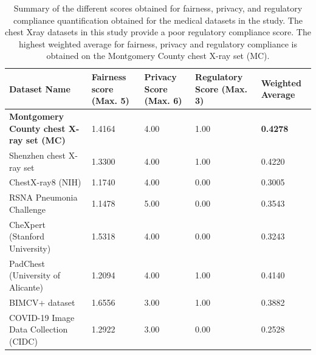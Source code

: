 \documentclass[journal]{IEEEtran}
\begin{document}
\begin{table}[]
\caption{\label{tab:fprsummarymedical}Summary of the different scores obtained for fairness, privacy, and regulatory compliance quantification obtained for the medical datasets in the study. The chest Xray datasets in this study provide a poor regulatory compliance score. The highest weighted average for fairness, privacy and regulatory compliance is obtained on the Montgomery County chest X-ray set (MC).}
\centering
\begin{tabular}{|p{}|C{0.13\textwidth}|C{0.13\textwidth}|C{0.13\textwidth}|C{0.13\textwidth}|}
\hline
\textbf{Dataset Name}                                                   & \textbf{Fairness score (Max. 5)} & \textbf{Privacy Score (Max. 6)} & \textbf{Regulatory Score (Max. 3)} & \textbf{Weighted Average} \\ \hline
\textbf{Montgomery County chest X-ray set (MC)} \cite{jaeger2014two}            & 1.4164                           & 4.00                            & 1.00                               & \textbf{0.4278}                    \\
Shenzhen chest X-ray set \cite{jaeger2014two}                          & 1.3300                           & 4.00                            & 1.00                               & 0.4220                    \\
ChestX-ray8 (NIH) \cite{wang2017chestx}                                & 1.1740                           & 4.00                            & 0.00                               & 0.3005                    \\
RSNA Pneumonia Challenge \cite{shih2019augmenting}                     & 1.1478                           & 5.00                            & 0.00                               & 0.3543                    \\
CheXpert (Stanford University) \cite{irvin2019chexpert}                & 1.5318                           & 4.00                            & 0.00                               & 0.3243                    \\
PadChest (University of Alicante) \cite{bustos2020padchest}            & 1.2094                           & 4.00                            & 1.00                               & 0.4140                    \\
BIMCV+ dataset \cite{vaya2020bimcv}                                    & 1.6556                           & 3.00                            & 1.00                               & 0.3882                    \\
COVID-19 Image Data Collection (CIDC) \cite{cohen2020covidProspective} & 1.2922                           & 3.00                            & 0.00                               & 0.2528                    \\ \hline
\end{tabular}
\end{table}
\end{document}
